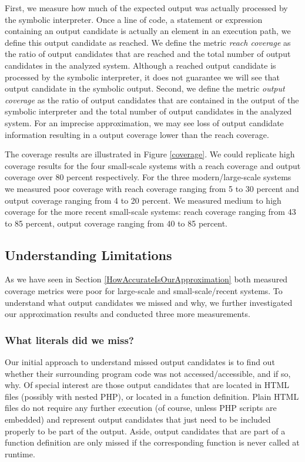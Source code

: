\documentclass[preprint]{sig-alternate-05-2015}
\begin{document}
First, we measure how much of the expected output was actually processed by the
symbolic interpreter.  Once a line of code, a statement or expression
containing an output candidate is actually an element in an execution path, we
define this output candidate as reached. We define the metric \emph{reach
coverage} as the ratio of output candidates that are reached and the total
number of output candidates in the analyzed system. Although a reached output
candidate is processed by the symbolic interpreter, it does not guarantee we
will see that output candidate in the symbolic output. Second, we define the
metric \emph{output coverage} as the ratio of output candidates that are
contained in the output of the symbolic interpreter and the total number of
output candidates in the analyzed system.  For an imprecise approximation, we
may see loss of output candidate information resulting in a output coverage
lower than the reach coverage.

The coverage results are illustrated in Figure \ref{coverage}. We could
replicate high coverage results for the four small-scale systems with a reach
coverage and output coverage over 80 percent respectively. For the three
modern/large-scale systems we measured poor coverage with reach coverage
ranging from 5 to 30 percent and output coverage ranging from 4 to 20 percent.
We measured medium to high coverage for the more recent small-scale systems:
reach coverage ranging from 43 to 85 percent, output coverage ranging from 40
to 85 percent.

\subsection{Understanding Limitations}
As we have seen in Section \ref{HowAccurateIsOurApproximation} both measured
coverage metrics were poor for large-scale and small-scale/recent systems. To
understand what output candidates we missed and why, we further investigated
our approximation results and conducted three more measurements.

\subsubsection{What literals did we miss?}\label{WhatLiteralsDidWeMiss?}
Our initial approach to understand missed output candidates is to find out
whether their surrounding program code was not accessed/accessible, and if so,
why. Of special interest are those output candidates that are located in HTML
files (possibly with nested PHP), or located in a function definition. Plain
HTML files do not require any further execution (of course, unless PHP scripts
are embedded) and represent output candidates that just need to be included
properly to be part of the output. Aside, output candidates that are part of a
function definition are only missed if the corresponding function is never
called at runtime.
\end{document}
